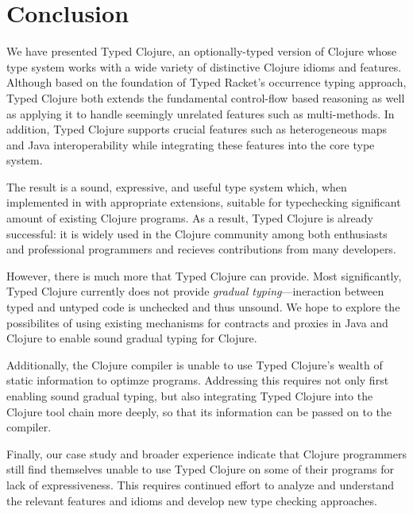 \section{Conclusion}
\label{sec:conclusion}

We have presented Typed Clojure, an optionally-typed version of
Clojure whose type system works with a wide variety of distinctive
Clojure idioms and features. Although based on the foundation of Typed
Racket's occurrence typing approach, Typed Clojure both extends the
fundamental control-flow based reasoning as well as applying it to
handle seemingly unrelated features such as multi-methods. In
addition, Typed Clojure supports crucial features such as heterogeneous
maps and Java interoperability while integrating these features into
the core type system.

The result is a sound, expressive, and useful type system which, when
implemented in \coretyped with appropriate extensions, suitable for
typechecking significant amount of existing Clojure programs.
%
As a result, Typed Clojure is already successful: it is widely used in
the Clojure community among both enthusiasts and professional
programmers and recieves contributions from many developers.


However, there is much more that Typed Clojure can provide. Most
significantly, Typed Clojure currently does not provide \emph{gradual
  typing}---ineraction between typed and untyped code is unchecked and
thus unsound. We hope to explore the possibilites of using existing
mechanisms for contracts and proxies in Java and
Clojure to enable sound gradual typing for Clojure.

Additionally, the Clojure compiler is unable to use Typed Clojure's
wealth of static information to optimze programs. Addressing this
requires not only first enabling sound gradual typing, but also
integrating Typed Clojure into the Clojure tool chain more deeply, so
that its information can be passed on to the compiler. 

Finally, our case study and broader experience indicate that Clojure
programmers still find themselves unable to use Typed Clojure on some
of their programs for lack of expressiveness. This requires continued
effort to analyze and understand the relevant features and idioms and
develop new type checking approaches.
